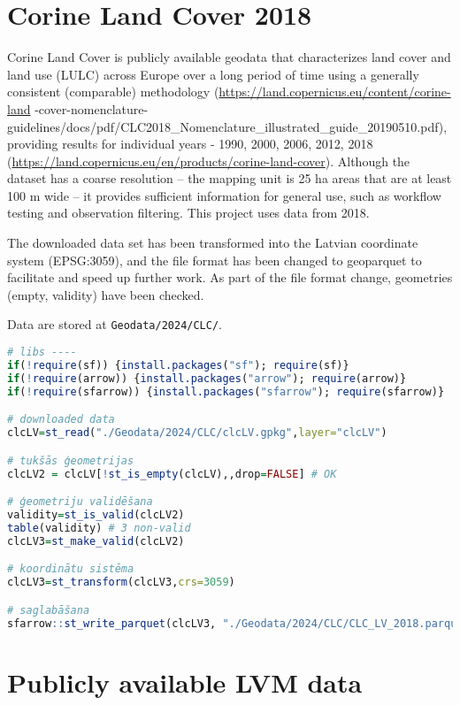 \documentclass[
]{book}
\newcommand{\passthrough}[1]{#1}
\begin{document}
\section{Corine Land Cover 2018}\label{Ch04.05}

Corine Land Cover is publicly available geodata that characterizes land cover
and land use (LULC) across Europe over a long period of time using a generally
consistent (comparable) methodology (\url{https://land.copernicus.eu/content/corine-land} -cover-nomenclature-guidelines/docs/pdf/CLC2018\_Nomenclature\_illustrated\_guide\_20190510.pdf),
providing results for individual years - 1990, 2000, 2006, 2012,
2018 (\url{https://land.copernicus.eu/en/products/corine-land-cover}).
Although the dataset has a coarse resolution -- the mapping unit is 25 ha areas
that are at least 100 m wide -- it provides sufficient information for general
use, such as workflow testing and observation filtering. This project uses
data from 2018.

The downloaded data set has been transformed into the Latvian coordinate
system (EPSG:3059), and the file format has been changed to geoparquet to
facilitate and speed up further work. As part of the file format change,
geometries (empty, validity) have been checked.

Data are stored at \passthrough{\lstinline!Geodata/2024/CLC/!}.

\begin{lstlisting}[language=R]
# libs ----
if(!require(sf)) {install.packages("sf"); require(sf)}
if(!require(arrow)) {install.packages("arrow"); require(arrow)}
if(!require(sfarrow)) {install.packages("sfarrow"); require(sfarrow)}

# downloaded data
clcLV=st_read("./Geodata/2024/CLC/clcLV.gpkg",layer="clcLV")

# tukšās ģeometrijas
clcLV2 = clcLV[!st_is_empty(clcLV),,drop=FALSE] # OK

# ģeometriju validēšana
validity=st_is_valid(clcLV2) 
table(validity) # 3 non-valid
clcLV3=st_make_valid(clcLV2)

# koordinātu sistēma
clcLV3=st_transform(clcLV3,crs=3059)

# saglabāšana
sfarrow::st_write_parquet(clcLV3, "./Geodata/2024/CLC/CLC_LV_2018.parquet")
\end{lstlisting}

\section{Publicly available LVM data}\label{Ch04.06}
\end{document}
